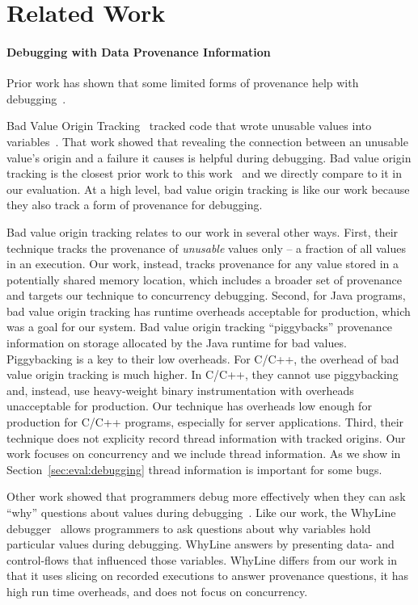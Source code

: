 \documentclass[pageno,nohyperref]{jpaper}
\begin{document}
\section{Related Work}


\paragraph{Debugging with Data Provenance Information}
Prior work has shown that some limited forms of provenance help
with debugging~\cite{badapples, whylineicse, tipslicingsurvey}. 



Bad Value Origin Tracking~\cite{badapples} tracked code that wrote unusable
values into variables~\cite{badapples}. That work showed that revealing the
connection between an unusable value's origin and a failure it causes is
helpful during debugging.  Bad value origin tracking is the closest prior work
to this work~\cite{badapples} and we directly compare to it in our evaluation.
At a high level, bad value origin tracking is like our work because they also track
a form of provenance for debugging.  

Bad value origin tracking relates to our work in several other ways.  First,
their technique tracks the provenance of {\em unusable} values only -- a
fraction of all values in an execution.  Our work, instead, tracks provenance
for any value stored in a potentially shared memory location, which includes a
broader set of provenance and targets our technique to concurrency debugging.
Second, for Java programs, bad value origin tracking has runtime overheads
acceptable for production, which was a goal for our system.  Bad value origin
tracking ``piggybacks'' provenance information on storage allocated by the Java
runtime for bad values.  Piggybacking is a key to their low overheads.  For
C/C++, the overhead of bad value origin tracking is much higher.  In C/C++,
they cannot use piggybacking and, instead, use heavy-weight binary
instrumentation with overheads unacceptable for production.  Our technique has
overheads low enough for production for C/C++ programs, especially for server
applications.  Third, their technique does not explicity record thread
information with tracked origins.  Our work focuses on concurrency and we
include thread information.  As we show in Section~\ref{sec:eval:debugging}
thread information is important for some bugs.  

Other work showed that programmers debug more effectively when they can ask
``why'' questions about values during
debugging~\cite{tipslicingsurvey,whylineicse}.  Like our work, the WhyLine
debugger~\cite{whylineicse, whylinechi} allows programmers to ask questions
about why variables hold particular values during debugging.  WhyLine answers
by presenting data- and control-flows that influenced those variables.  WhyLine
differs from our work in that it uses slicing on recorded executions to answer
provenance questions, it has high run time overheads, and does not focus on
concurrency.
\end{document}
